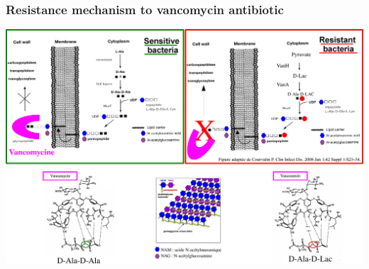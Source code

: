 \begin{frame}
    \frametitle{Resistance mechanism to vancomycin antibiotic}
    \includegraphics[width=\textwidth]{figures/ResistanceMechanism.png}
\end{frame}
